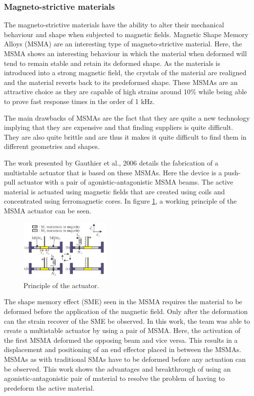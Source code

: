 \subsubsection{Magneto-strictive materials}
The magneto-strictive materials have the ability to alter their mechanical behaviour and shape when subjected to magnetic fields. Magnetic Shape Memory Alloys (MSMA) are an interesting type of magneto-strictive material. Here, the MSMA shows an interesting behaviour in which the material when deformed will tend to remain stable and retain its deformed shape. As the materials is introduced into a strong magnetic field, the crystals of the material are realigned and the material reverts back to its predeformed shape. These MSMAs are an attractive choice as they are capable of high strains around 10\% while being able to prove fast response times in the order of 1 kHz\cite{faran_ferromagnetic_2016}.

The main drawbacks of MSMAs are the fact that they are quite a new technology implying that they are expensive and that finding suppliers is quite difficult. They are also quite brittle and are thus it makes it quite difficult to find them in different geometries and shapes.

The work presented by Gauthier et al., 2006\cite{gauthier_multistable_2006} details the fabrication of a multistable actuator that is based on these MSMAs. Here the device is a push-pull actuator with a pair of agonistic-antagonistic MSMA beams. The active material is actuated using magnetic fields that are created using coils and concentrated using ferromagnetic cores. In figure \ref{fig:MSMA_princ}, a working principle of the MSMA actuator can be seen.

\begin{figure}
	\centering
	\includegraphics[width=0.4\textwidth]{Figures/MSMA_princ.png}
	\caption{Principle of the actuator\cite{gauthier_multistable_2006}.}
	\label{fig:MSMA_princ}
\end{figure}
The shape memory effect (SME) seen in the MSMA requires the material to be deformed before the application of the magnetic field. Only after the deformation can the strain recover of the SME be observed. In this work, the team was able to create a multistable actuator by using a pair of MSMA. Here, the activation of the first MSMA deformed the opposing beam and vice versa. This results in a displacement and positioning of an end effector placed in between the MSMAs. MSMAs as with traditional SMAs have to be deformed before any actuation can be observed. This work shows the advantages and breakthrough of using an agonistic-antagonistic pair of material to resolve the problem of having to predeform the active material.

